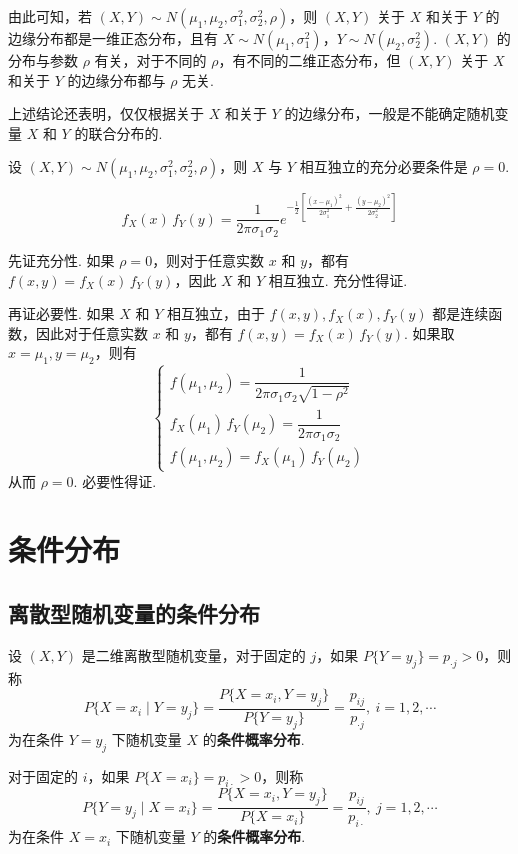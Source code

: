 由此可知，若 $(X,Y) \sim N(\mu_1,\mu_2,\sigma_1^2,\sigma_2^2,\rho)$，则 $(X,Y)$ 关于 $X$ 和关于 $Y$ 的边缘分布都是一维正态分布，且有 $X \sim N(\mu_1,\sigma_1^2)$，$Y \sim N(\mu_2,\sigma_2^2)$. $(X,Y)$ 的分布与参数 $\rho$ 有关，对于不同的 $\rho$，有不同的二维正态分布，但 $(X,Y)$ 关于 $X$ 和关于 $Y$ 的边缘分布都与 $\rho$ 无关.

上述结论还表明，仅仅根据关于 $X$ 和关于 $Y$ 的边缘分布，一般是不能确定随机变量 $X$ 和 $Y$ 的联合分布的.

\begin{conclusion}
    设 $(X,Y) \sim N(\mu_1,\mu_2,\sigma_1^2,\sigma_2^2,\rho)$，则 $X$ 与 $Y$ 相互独立的充分必要条件是 $\rho=0$.
\end{conclusion}

\begin{myproof}
    $$
    f_{X}(x) \, f_{Y}(y) = \dfrac{1}{2 \pi \sigma_1 \sigma_2} e^{-\frac{1}{2} \left[ \frac{(x-\mu_1)^2}{2 \sigma_1^2} + \frac{(y-\mu_2)^2}{2 \sigma_2^2} \right]}
    $$

    先证充分性. 如果 $\rho=0$，则对于任意实数 $x$ 和 $y$，都有 $f(x,y) = f_{X}(x) \, f_{Y}(y)$，因此 $X$ 和 $Y$ 相互独立. 充分性得证.

    再证必要性. 如果 $X$ 和 $Y$ 相互独立，由于 $f(x,y), f_{X}(x), f_{Y}(y)$ 都是连续函数，因此对于任意实数 $x$ 和 $y$，都有 $f(x,y) = f_{X}(x) \, f_{Y}(y)$. 如果取 $x=\mu_1, y=\mu_2$，则有
    $$
    \begin{cases}
        f(\mu_1,\mu_2) = \dfrac{1}{2 \pi \sigma_1 \sigma_2 \sqrt{1-\rho^2}} \\[0.5em]
        f_{X}(\mu_1) \, f_{Y}(\mu_2) = \dfrac{1}{2 \pi \sigma_1 \sigma_2} \\[0.5em]
        f(\mu_1,\mu_2) = f_{X}(\mu_1) \, f_{Y}(\mu_2)
    \end{cases}
    $$
    从而 $\rho=0$. 必要性得证.
\end{myproof}

\section{条件分布}

\subsection{离散型随机变量的条件分布}

\begin{definition}
    设 $(X,Y)$ 是二维离散型随机变量，对于固定的 $j$，如果 $P\{Y = y_j\} = p_{\cdot j} > 0$，则称
    $$
    P\{X=x_i \mid Y=y_j\} = \dfrac{P\{X=x_i, Y=y_j\}}{P\{Y=y_j\}} = \dfrac{p_{ij}}{p_{\cdot j}},\ i=1,2,\cdots
    $$
    为在条件 $Y=y_j$ 下随机变量 $X$ 的\textbf{条件概率分布}.
    
    对于固定的 $i$，如果 $P\{X=x_i\} = p_{i \cdot} > 0$，则称
    $$
    P\{Y=y_j \mid X=x_i\} = \dfrac{P\{X=x_i,Y=y_j\}}{P\{X=x_i\}} = \dfrac{p_{ij}}{p_{i \cdot}},\ j=1,2,\cdots
    $$
    为在条件 $X=x_i$ 下随机变量 $Y$ 的\textbf{条件概率分布}.
\end{definition}


